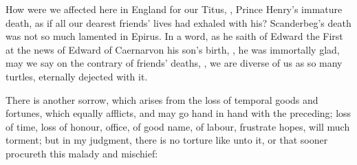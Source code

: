 
How were we affected here in England for our Titus, , Prince Henry's immature death, as if all our dearest friends' lives
had exhaled with his? Scanderbeg's death was not so much
lamented in Epirus. In a word, as he saith of Edward the
First at the news of Edward of Caernarvon his son's birth, , he was immortally glad, may we say on the contrary of friends'
deaths, , we are diverse of us as so many turtles,
eternally dejected with it.

There is another sorrow, which arises from the loss of temporal goods and
fortunes, which equally afflicts, and may go hand in hand with the preceding;
loss of time, loss of honour, office, of good name, of labour, frustrate hopes,
will much torment; but in my judgment, there is no torture like unto it, or
that sooner procureth this malady and mischief:


